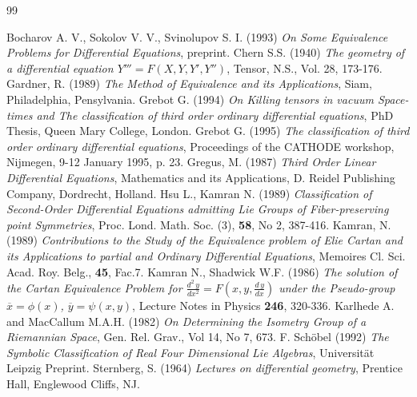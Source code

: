 \begin{thebibliography}{99}

 Bocharov A. V., Sokolov V. V., Svinolupov S. I. (1993) 
                     {\it On Some Equivalence Problems for Differential  
                     Equations}, preprint.
 Chern S.S. (1940) 
                   {\it The geometry of a differential equation 
                    $Y'''=F(X,Y,Y',Y'')$}, 
                   Tensor, N.S., Vol. 28, 173-176.
 Gardner, R. (1989) 
                    {\it The Method of Equivalence and its Applications}, 
                    Siam, Philadelphia, Pensylvania.
 Grebot G. (1994) 
                     {\it On Killing tensors in vacuum Space-times and 
                     The classification of third order  
                      ordinary differential equations},
                     PhD Thesis, Queen Mary College, London.
 Grebot G. (1995) 
                    {\it The classification of third order ordinary 
                    differential equations},
                    Proceedings of the CATHODE workshop, Nijmegen, 
                    9-12 January 1995, p. 23.
 Gregus, M. (1987) 
                     {\it Third Order Linear Differential Equations}, 
                     Mathematics and its Applications, 
                     D. Reidel Publishing Company, Dordrecht, Holland.
 Hsu L., Kamran N. (1989) 
                     {\it Classification of Second-Order Differential 
                     Equations admitting Lie Groups of Fiber-preserving 
                     point Symmetries}, 
                     Proc. Lond. Math. Soc. (3), {\bf 58}, No 2, 387-416.
 Kamran, N. (1989) 
                     {\it Contributions to the Study of the Equivalence 
                     problem of Elie Cartan and its Applications 
                     to partial and Ordinary Differential Equations}, 
                     Memoires Cl. Sci. Acad. Roy. Belg., {\bf 45}, Fac.7.
 Kamran N., Shadwick W.F. (1986) 
                     {\it The solution of the Cartan Equivalence Problem for 
                      $\frac{d^{2}\,y}{dx^{2}}=F(x,y,\frac{d\,y}{dx})$ 
                      under the Pseudo-group $\overline{x}=\phi(x)$, 
                      $\overline{y}=\psi(x,y)$}, 
                      Lecture Notes in Physics {\bf 246}, 320-336.
 Karlhede A. and MacCallum M.A.H. (1982) 
                       {\it On Determining the Isometry Group of a Riemannian 
                       Space}, 
                       Gen. Rel. Grav., Vol 14, No 7, 673.
 F. Sch\"{o}bel (1992)
                   {\it The Symbolic Classification of Real Four Dimensional
                    Lie Algebras},
                    Universit\"{a}t Leipzig Preprint.
 Sternberg, S. (1964) 
                     {\it Lectures on differential geometry}, 
                    Prentice Hall, Englewood Cliffs, NJ.
\end{thebibliography}

